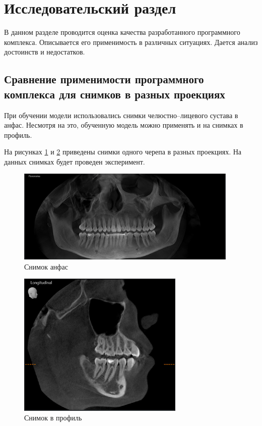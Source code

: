 \section{Исследовательский раздел}

В данном разделе проводится оценка качества разработанного программного комплекса. Описывается его применимость в различных ситуациях. Дается анализ достоинств и недостатков.

\subsection{Сравнение применимости программного комплекса для снимков в разных проекциях}

При обучении модели использовались снимки челюстно--лицевого сустава в анфас. Несмотря на это, обученную модель можно применять и на снимках в профиль.

На рисунках \ref{fig:anfas} и \ref{fig:profile} приведены снимки одного черепа в разных проекциях. На данных снимках будет проведен эксперимент.

\begin{figure}[H]
	\centering
	\includegraphics[width=400px]{img/anfas.jpeg}
	\caption{Снимок анфас}
	\label{fig:anfas}
\end{figure}

\begin{figure}[H]
	\centering
	\includegraphics[width=300px]{img/profile.jpeg}
	\caption{Снимок в профиль}
	\label{fig:profile}
\end{figure}


